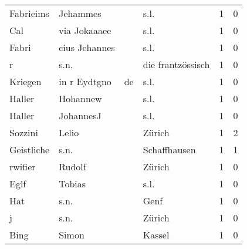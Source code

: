 \begin{center}
\begin{tiny}
\begin{longtabu}{llllrr}
                Fabrieims &                           Jehammes &             &                                        s.l. &          1 &         0 \\
                      Cal &                       via Jokaaaee &             &                                        s.l. &          1 &         0 \\
                    Fabri &                      cius Jehannes &             &                                        s.l. &          1 &         0 \\
                        r &                               s.n. &             &                           die frantzössisch &          1 &         0 \\
                  Kriegen &                       in r Eydtgno &          de &                                        s.l. &          1 &         0 \\
                   Haller &                           Hohannew &             &                                        s.l. &          1 &         0 \\
                   Haller &                          JohannesJ &             &                                        s.l. &          1 &         0 \\
                  Sozzini &                              Lelio &             &                                      Zürich &          1 &         2 \\
               Geistliche &                               s.n. &             &                                Schaffhausen &          1 &         1 \\
                  rwifier &                             Rudolf &             &                                      Zürich &          1 &         0 \\
                     Eglf &                             Tobias &             &                                        s.l. &          1 &         0 \\
                      Hat &                               s.n. &             &                                        Genf &          1 &         0 \\
                        j &                               s.n. &             &                                      Zürich &          1 &         0 \\
                     Bing &                              Simon &             &                                      Kassel &          1 &         0 \\

\end{longtabu}
\end{tiny}
\end{center}
